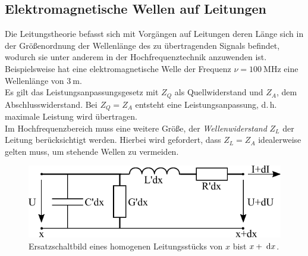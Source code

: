 \documentclass[a4paper,twoside,final]{article}
\begin{document}
\subsection{Elektromagnetische Wellen auf Leitungen}
Die Leitungstheorie befasst sich mit Vorgängen auf Leitungen deren Länge sich in der Größenordnung der Wellenlänge
des zu übertragenden Signals befindet, wodurch sie unter anderem in der Hochfrequenztechnik anzuwenden ist. Beispielsweise hat eine elektromagnetische Welle der Frequenz $\nu = \SI{100}{\mega\hertz}$ eine Wellenlänge von $\SI{3}{\metre}$.\\
Es gilt das Leistungsanpassungsgesetz mit $Z_Q$ als Quellwiderstand und $Z_A$, dem Abschlusswiderstand. Bei $Z_Q = Z_A$ entsteht eine Leistungsanpassung, d.\,h. maximale Leistung wird übertragen.\\
Im Hochfrequenzbereich muss eine weitere Größe, der \textit{Wellenwiderstand} $Z_L$ der Leitung berücksichtigt werden. Hierbei wird gefordert, dass $Z_L = Z_A$ idealerweise gelten muss, um stehende Wellen zu vermeiden.
\begin{figure}[htp]
    \centering
    \includegraphics{Schaltungen/Ersatzschaltbild.pdf}
    \caption{Ersatzschaltbild eines homogenen Leitungsstücks von $x$ bist $x+\mathrm{\;d} x$.}
    \label{fig:Ersatzschaltbild}
\end{figure}\\
\end{document}

